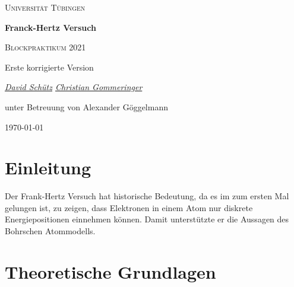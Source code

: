\documentclass[a4paper, 12pt]{scrartcl}
\begin{document}
\begin{titlepage}
	\centering
	{\scshape\LARGE Universität Tübingen \par}
	\vspace{2cm}
	{\huge\bfseries Franck-Hertz Versuch \par}
	\vspace{2cm}
	{\Large \scshape Blockpraktikum 2021} \par
	\vspace{2cm}
	{\Large  Erste korrigierte Version} \par
	\vspace{2cm}
	{\Large\itshape \underline{David Schütz} \space \space  \underline{Christian Gommeringer}\par}
	\vfill 
	{\large unter Betreuung von Alexander Göggelmann }
	\vfill

	{\large \today\par}
\end{titlepage}
\newpage 
\tableofcontents 

\newpage
\section{Einleitung}
\begin{flushleft}
Der Frank-Hertz Versuch hat historische Bedeutung, da es im zum ersten Mal gelungen ist, zu zeigen, dass Elektronen in einem Atom nur diskrete Energiepositionen einnehmen können. Damit unterstützte er die Aussagen des Bohrschen Atommodells.



\end{flushleft}
\section{Theoretische Grundlagen} 
\end{document}
